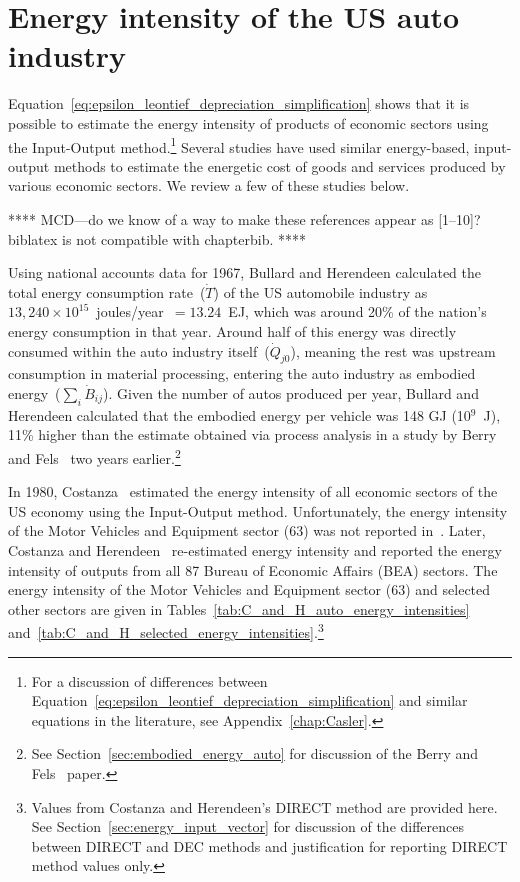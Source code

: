 \section{Energy intensity of the US auto industry}
\label{sec:intensity_auto}

Equation~\ref{eq:epsilon_leontief_depreciation_simplification} shows 
that it is possible to estimate the energy intensity 
of products of economic sectors using the Input-Output method.\footnote{For a discussion
of differences between Equation~\ref{eq:epsilon_leontief_depreciation_simplification} 
and similar equations in the literature, 
see Appendix~\ref{chap:Casler}.}
Several studies have used similar energy-based, 
input-output methods to estimate the energetic
cost of goods and services produced by various
economic sectors.\cite{Bullard1975, Costanza:1980ww, Costanza:1984tq, EIOLCA2014, Hendrickson2006,
Herendeen1973, Herendeen1974, Herendeen1974a, Herendeen1978,
Wright1974, Lenzen1998, Machado2001}
We review a few of these studies below.

**** MCD---do we know of a way to make these references
appear as [1--10]? biblatex is not compatible with chapterbib. ****

Using national accounts data for 1967,
Bullard and Herendeen calculated the
total energy consumption rate~($\dot{T}$)
of the US automobile industry as 
$13,240 \times 10^{15}$~joules/year~$= 13.24$~EJ,
which was around 20\% of the nation's
energy consumption in that year.\cite{Bullard1975}
Around half of this energy was directly
consumed within the auto industry itself~($\dot{Q}_{j0}$),
meaning the rest was upstream consumption
in material processing, 
entering the auto industry as embodied 
energy~($\sum_{i}\dot{B}_{ij}$).
Given the number of autos produced per year, 
Bullard and Herendeen calculated that 
the embodied energy per vehicle was 148 GJ (10$^{9}$~J),
11\% higher than the estimate obtained via process analysis in a
study by Berry and Fels~\cite{Berry:1973vo} two years earlier.\footnote{See
Section~\ref{sec:embodied_energy_auto} for discussion 
of the Berry and Fels~\cite{Berry:1973vo} paper.}

In 1980, Costanza~\cite{Costanza:1980ww} estimated 
the energy intensity of all economic sectors of the US economy
using the Input-Output method.
Unfortunately, the energy intensity 
of the Motor Vehicles and Equipment sector (63) was not reported
in~\cite{Costanza:1980ww}.
Later, Costanza and Herendeen~\cite{Costanza:1984tq} re-estimated
energy intensity and reported the energy intensity 
of outputs from all 87 Bureau of Economic Affairs 
(BEA) sectors.
The energy intensity of the Motor Vehicles and Equipment sector (63) 
and selected other sectors are given in 
Tables~\ref{tab:C_and_H_auto_energy_intensities}
and~\ref{tab:C_and_H_selected_energy_intensities}.\footnote{Values 
from Costanza and Herendeen's 
DIRECT method are provided here. 
See Section~\ref{sec:energy_input_vector} for discussion
of the differences between DIRECT and DEC methods
and justification for reporting
DIRECT method values only.} 

